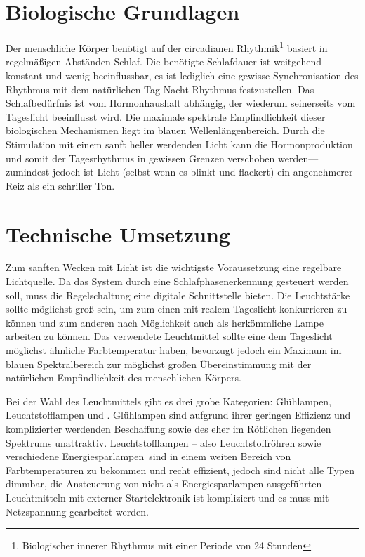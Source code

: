 \documentclass[12pt,a4paper,notitlepage]{article}
\begin{document}
\section{Biologische Grundlagen}
Der menschliche Körper benötigt auf der circadianen Rhythmik\footnote{Biologischer innerer Rhythmus mit einer Periode von 24 Stunden} basiert in regelmäßigen Ab\-stän\-den Schlaf. Die benötigte Schlafdauer ist weitgehend konstant und wenig beeinflussbar, es ist lediglich eine gewisse Synchronisation des Rhythmus mit dem natürlichen Tag-Nacht-Rhythmus festzustellen. Das Schlafbedürfnis ist vom Hormonhaushalt abhängig\cite{WP9}, der wiederum seinerseits vom Tageslicht beeinflusst wird. Die maximale spektrale Empfindlichkeit dieser biologischen Mechanismen liegt im blauen Wellenlängenbereich.
\cite{WP5, WP6, WP7, WP8}
Durch die Stimulation mit einem sanft heller werdenden Licht kann die Hormonproduktion und somit der Tagesrhythmus in gewissen Grenzen verschoben werden---zumindest jedoch ist Licht (selbst wenn es blinkt und flackert) ein angenehmerer Reiz als ein schriller Ton.

\section{Technische Umsetzung}
Zum sanften Wecken mit Licht ist die wichtigste Voraussetzung eine regelbare Lichtquelle. Da das System durch eine Schlafphasenerkennung gesteuert werden soll, muss die Regelschaltung eine digitale Schnittstelle bieten. Die Leuchtstärke sollte möglichst groß sein, um zum einen mit realem Tageslicht konkurrieren zu können und zum anderen nach Möglichkeit auch als herkömmliche Lampe arbeiten zu können. Das verwendete Leuchtmittel sollte eine dem Tageslicht möglichst ähnliche Farbtemperatur haben, bevorzugt jedoch ein Maximum im blauen Spektralbereich zur möglichst großen Übereinstimmung mit der natürlichen Empfindlichkeit des menschlichen Körpers.

Bei der Wahl des Leuchtmittels gibt es drei grobe Kategorien: Glühlampen, Leuchtstofflampen und . Glühlampen sind aufgrund ihrer geringen Effizienz und komplizierter werdenden Beschaffung sowie des eher im Rötlichen liegenden Spektrums unattraktiv. Leuchtstofflampen -- also Leuchtstoffröhren sowie verschiedene \glqq Energiesparlampen\grqq\ sind in einem weiten Bereich von Farbtemperaturen zu bekommen und recht effizient, jedoch sind nicht alle Typen dimmbar, die Ansteuerung von nicht als Energiesparlampen ausgeführten Leuchtmitteln mit externer Startelektronik ist kompliziert und es muss mit Netzspannung gearbeitet werden.
\end{document}
